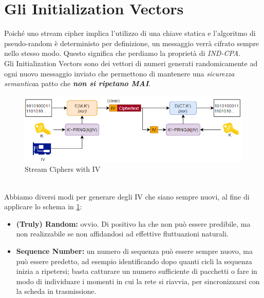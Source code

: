 \section{Gli Initialization Vectors}
Poiché uno stream cipher implica l'utilizzo di una chiave statica e l'algoritmo di pseudo-random è deterministo per definizione, un messaggio verrà cifrato sempre nello stesso modo. Questo significa che perdiamo la proprietà di \textit{IND-CPA}.\\
Gli Initialization Vectors sono dei vettori di numeri generati randomicamente ad ogni nuovo messaggio inviato che permettono di mantenere una \textit{sicurezza semantica}\footnotemark  a patto che \textbf{\textit{non si ripetano MAI}}.
\begin{figure}[ht]
    \centering
    \includegraphics[width=\textwidth]{image/streamIV.png}
    \caption{Stream Ciphers with IV}
    \label{fig:streamiv}
\end{figure}\\
Abbiamo diversi modi per generare degli IV che siano sempre nuovi, al fine di applicare lo schema in \cref{fig:streamiv}:

\begin{itemize}
    \item \textbf{(Truly) Random:} ovvio. Di positivo ha che non può essere predibile, ma non realizzabile se non affidandosi ad effettive fluttuazioni naturali.
    \item \textbf{Sequence Number:} un numero di sequenza può essere sempre nuovo, ma può essere predetto, ad esempio identificando dopo quanti cicli la sequenza inizia a ripetersi; basta catturare un numero sufficiente di pacchetti o fare in modo di individuare i momenti in cui la rete si riavvia, per sincronizzarsi con la scheda in trasmissione.
\end{itemize}

